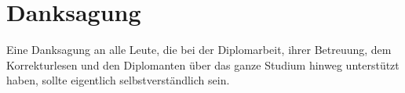 \chapter*{Danksagung}

Eine Danksagung an alle Leute, die bei der Diplomarbeit, ihrer Betreuung,
dem Korrekturlesen und den Diplomanten über das ganze Studium hinweg
unterstützt haben, sollte eigentlich selbstverständlich sein.
